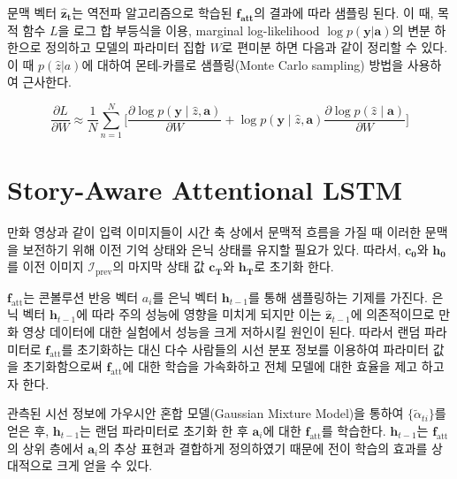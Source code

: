 \documentclass{kcc}
\newcommand{\vy}[0]{\mathbf{y}}
\newcommand{\va}[0]{\mathbf{a}}
\newcommand{\vh}[0]{\mathbf{h}}
\newcommand{\vz}[0]{\mathbf{z}}
\newcommand{\sa}[0]{\mathbf{a}}
\newcommand{\ff}[0]{\mathbf{f}}
\begin{document}
문맥 벡터 $\mathbf{\hat{z}_t}$는 역전파 알고리즘으로 학습된 $\mathbf{f_{\text{att}}}$의 결과에 따라 샘플링 된다. 이 때, 목적 함수 $\mathit{L}$을 로그 합 부등식을 이용, marginal log-likelihood $\log p(\mathbf{y}|\mathbf{a})$의 변분 하한으로 정의하고 모델의 파라미터 집합 $W$로 편미분 하면 다음과 같이 정리할 수 있다\cite{Xu2015}. 이 때 $p(\hat{z}|a)$에 대하여 몬테-카를로 샘플링(Monte Carlo sampling) 방법을 사용하여 근사한다.

\begin{equation} 
 \frac{\partial L}{\partial W} \approx \frac{1}{N} \sum_{n=1}^{N} \bigg[ \frac{\partial \log p(\vy \mid \hat{z}, \va)}{\partial W} + 
                                \log p(\vy \mid \hat{z}, \va) \frac{\partial \log p(\hat{z} \mid \va)}{\partial W} \bigg]
\end{equation} 

\section{Story-Aware Attentional LSTM}

만화 영상과 같이 입력 이미지들이 시간 축 상에서 문맥적 흐름을 가질 때 이러한 문맥을 보전하기 위해 이전 기억 상태와 은닉 상태를 유지할 필요가 있다. 따라서, $\mathbf{c_0}$와 $\mathbf{h_0}$를 이전 이미지 $\mathcal{I}_{\text{prev}}$의 마지막 상태 값 $\mathbf{c_T}$와 $\mathbf{h_T}$로 초기화 한다.

$\ff_{\text{att}}$는 콘볼루션 반응 벡터 $a_i$를 은닉 벡터 $\vh_{t-1}$를 통해 샘플링하는 기제를 가진다. 은닉 벡터 $\vh_{t-1}$에 따라 주의 성능에 영향을 미치게 되지만 이는 $\hat{\vz}_{t-1}$에 의존적이므로 만화 영상 데이터에 대한 실험에서 성능을 크게 저하시킬 원인이 된다. 따라서 랜덤 파라미터로 $\ff_{\text{att}}$를 초기화하는 대신 다수 사람들의 시선 분포 정보를 이용하여 파라미터 값을 초기화함으로써 $\ff_{\text{att}}$에 대한 학습을 가속화하고 전체 모델에 대한 효율을 제고 하고자 한다.

관측된 시선 정보에 가우시안 혼합 모델(Gaussian Mixture Model)을 통하여 $\{\tilde{\alpha}_{ti}\}$를 얻은 후, $\vh_{t-1}$는 랜덤 파라미터로 초기화 한 후 $\sa_i$에 대한 $\ff_{\text{att}}$를 학습한다. $\vh_{t-1}$는 $\ff_{\text{att}}$의 상위 층에서 $\sa_i$의 추상 표현과 결합하게 정의하였기 때문에 전이 학습의 효과를 상대적으로 크게 얻을 수 있다\cite{yosinski2014}. 
\end{document}
